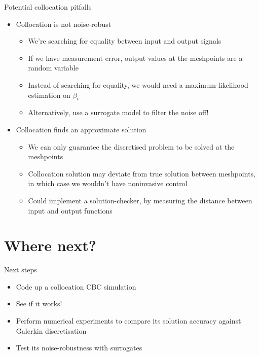 \documentclass[presentation]{beamer}
\begin{document}
\begin{frame}[label={sec:orgc1677c0}]{Potential collocation pitfalls}
\begin{itemize}
\item Collocation is not noise-robust
\begin{itemize}
\item We're searching for equality between input and output signals
\item If we have measurement error, output values at the meshpoints are a random variable
\item Instead of searching for equality, we would need a maximum-likelihood estimation on \(\beta_i\)
\item Alternatively, use a surrogate model to filter the noise off!
\end{itemize}
\end{itemize}
\vfill
\begin{itemize}
\item Collocation finds an approximate solution
\begin{itemize}
\item We can only guarantee the discretised problem to be solved at the meshpoints
\item Collocation solution may deviate from true solution between meshpoints, in which case we wouldn't have noninvasive control
\item Could implement a solution-checker, by measuring the distance between input and output functions
\end{itemize}
\end{itemize}
\end{frame}

\section{Where next?}
\label{sec:org60f7ef2}
\begin{frame}[label={sec:orgd77df3c}]{Next steps}
\begin{itemize}
\item Code up a collocation CBC simulation
\end{itemize}
\vfill
\begin{itemize}
\item See if it works!
\end{itemize}
\vfill
\begin{itemize}
\item Perform numerical experiments to compare its solution accuracy against Galerkin discretisation
\end{itemize}
\vfill
\begin{itemize}
\item Test its noise-robustness with surrogates
\end{itemize}
\end{frame}
\end{document}
